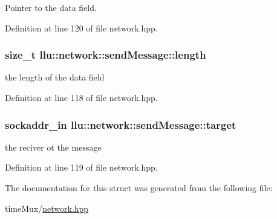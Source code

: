 Pointer to the data field. 



Definition at line 120 of file network.\+hpp.

\hypertarget{structllu_1_1network_1_1send_message_ae582fa0aa75b342c31c59ce2410eba59}{
\subsubsection[{length}]{\setlength{\rightskip}{0pt plus 5cm}size\+\_\+t llu\+::network\+::send\+Message\+::length}}\label{structllu_1_1network_1_1send_message_ae582fa0aa75b342c31c59ce2410eba59}


the length of the data field 



Definition at line 118 of file network.\+hpp.

\hypertarget{structllu_1_1network_1_1send_message_ad25654cbeb601ad6fef4232e950b291c}{
\subsubsection[{target}]{\setlength{\rightskip}{0pt plus 5cm}sockaddr\+\_\+in llu\+::network\+::send\+Message\+::target}}\label{structllu_1_1network_1_1send_message_ad25654cbeb601ad6fef4232e950b291c}


the reciver ot the message 



Definition at line 119 of file network.\+hpp.



The documentation for this struct was generated from the following file\+:\begin{DoxyCompactItemize}
\item 
time\+Mux/\hyperlink{network_8hpp}{network.\+hpp}\end{DoxyCompactItemize}
